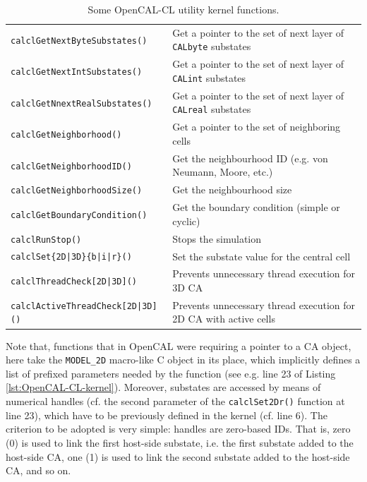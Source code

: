 \begin{table}
\begin{footnotesize}
\begin{tabular}{l|l}
    \verb'calclGetNextByteSubstates()'    & Get a pointer to the set of next layer of \verb'CALbyte' substates \\
    \verb'calclGetNextIntSubstates()'     & Get a pointer to the set of next layer of \verb'CALint' substates \\
    \verb'calclGetNnextRealSubstates()'   & Get a pointer to the set of next layer of \verb'CALreal' substates \\
    \verb'calclGetNeighborhood()'         & Get a pointer to the set of neighboring cells \\
    \verb'calclGetNeighborhoodID()'       & Get the neighbourhood ID (e.g. von Neumann, Moore, etc.) \\
    \verb'calclGetNeighborhoodSize()'     & Get the neighbourhood size \\
    \verb'calclGetBoundaryCondition()'    & Get the boundary condition (simple or cyclic) \\
    \verb'calclRunStop()'                 & Stops the simulation \\
    \verb'calclSet{2D|3D}{b|i|r}()'       & Set the substate value for the central cell\\
    \verb'calclThreadCheck[2D|3D]()'      & Prevents unnecessary thread execution for 3D CA\\
    \verb'calclActiveThreadCheck[2D|3D]()'& Prevents unnecessary thread execution for 2D CA with active cells\\
    \hline
    \end{tabular}
    \end{footnotesize}
  \caption{Some OpenCAL-CL utility kernel functions.}
  \label{tab:kernel-utility-function}
\end{table}

Note that, functions that in OpenCAL were requiring a pointer to a CA
object, here take the \verb'MODEL_2D' macro-like C object in its
place, which implicitly defines a list of prefixed parameters needed
by the function (see e.g. line 23 of Listing
\ref{lst:OpenCAL-CL-kernel}). Moreover, substates are accessed by means
of numerical handles (cf. the second parameter of the
\verb'calclSet2Dr()' function at line 23), which have to be previously
defined in the kernel (cf. line 6). The criterion to be adopted
is very simple: handles are zero-based IDs. That is, zero (0) is used to link the
first host-side substate, i.e. the first substate added to the
host-side CA, one (1) is used to link the second substate added to the
host-side CA, and so on.

